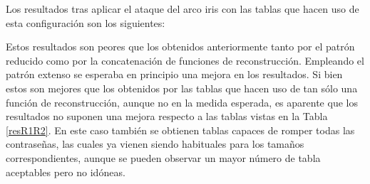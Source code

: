 \documentclass[12pt,spanish,listoffigures,listoftables,listofalgorithms]{tfgetsinf}
\begin{document}
Los resultados tras aplicar el ataque del arco iris con las tablas que hacen uso de esta configuración son los siguientes:

\def\arraystretch{1.5}
\begin{table}[H]
	\LARGE
	\centering
	\caption{Porcentajes de éxito para las tablas empleando el patrón extenso}
	\label{resPG}
\end{table}

Estos resultados son peores que los obtenidos anteriormente tanto por el patrón reducido como por la concatenación de funciones de reconstrucción. Empleando el patrón extenso se esperaba en principio una mejora en los resultados. Si bien estos son mejores que los obtenidos por las tablas que hacen uso de tan sólo una función de reconstrucción, aunque no en la medida esperada, es aparente que los resultados no suponen una mejora respecto a las tablas vistas en la Tabla \ref{resR1R2}. En este caso también se obtienen tablas capaces de romper todas las contraseñas, las cuales ya vienen siendo habituales para los tamaños correspondientes, aunque se pueden observar un mayor número de tabla aceptables pero no idóneas.
\end{document}
